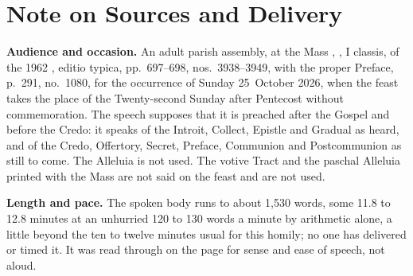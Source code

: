 
\section*{Note on Sources and Delivery}

{\footnotesize

\textbf{Audience and occasion.} An adult parish assembly, at the Mass
, , I classis,
of the 1962 , editio typica, pp.~697--698,
nos.~3938--3949, with the proper Preface, p.~291, no.~1080, for the occurrence
of Sunday 25~October 2026, when the feast takes the place of the
Twenty-second Sunday after Pentecost without commemoration. The speech
supposes that it is preached after the Gospel and before the Credo: it speaks
of the Introit, Collect, Epistle and Gradual as heard, and of the Credo,
Offertory, Secret, Preface, Communion and Postcommunion as still to come. The
Alleluia is not used. The votive Tract and the paschal Alleluia printed with
the Mass are not said on the feast and are not used.

\textbf{Length and pace.} The spoken body runs to about 1,530 words, some 11.8
to 12.8 minutes at an unhurried 120 to 130 words a minute by arithmetic alone,
a little beyond the ten to twelve minutes usual for this homily; no one
has delivered or timed it. It was read through on the page for sense and ease
of speech, not aloud.

}
